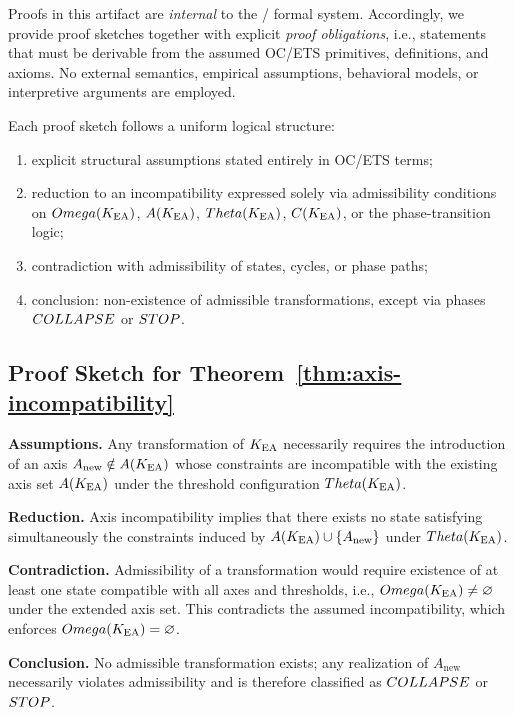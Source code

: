 ﻿%

Proofs in this artifact are \emph{internal} to the
\OC/ formal system. Accordingly, we provide proof
sketches together with explicit \emph{proof obligations}, i.e., statements
that must be derivable from the assumed OC/ETS primitives, definitions,
and axioms. No external semantics, empirical assumptions, behavioral
models, or interpretive arguments are employed.

Each proof sketch follows a uniform logical structure:
\begin{enumerate}
  \item explicit structural assumptions stated entirely in OC/ETS terms;
  \item reduction to an incompatibility expressed solely via admissibility
  conditions on $Omega(K_{\mathrm{EA}})$, $A(K_{\mathrm{EA}})$, $Theta(K_{\mathrm{EA}})$, $C(K_{\mathrm{EA}})$, or the
  phase-transition logic;
  \item contradiction with admissibility of states, cycles, or phase paths;
  \item conclusion: non-existence of admissible transformations, except via
  phases $COLLAPSE$ or $STOP$.
\end{enumerate}

\subsection*{Proof Sketch for Theorem~\ref{thm:axis-incompatibility}}

\textbf{Assumptions.}
Any transformation of $K_{\mathrm{EA}}$ necessarily requires the introduction of an
axis $A_{\mathrm{new}} \notin A(K_{\mathrm{EA}})$ whose constraints are incompatible
with the existing axis set $A(K_{\mathrm{EA}})$ under the threshold configuration
$Theta(K_{\mathrm{EA}})$.

\textbf{Reduction.}
Axis incompatibility implies that there exists no state satisfying
simultaneously the constraints induced by
$A(K_{\mathrm{EA}})\cup\{A_{\mathrm{new}}\}$ under $Theta(K_{\mathrm{EA}})$.

\textbf{Contradiction.}
Admissibility of a transformation would require existence of at least one
state compatible with all axes and thresholds, i.e.,
$Omega(K_{\mathrm{EA}})\neq\varnothing$ under the extended axis set. This contradicts
the assumed incompatibility, which enforces
$Omega(K_{\mathrm{EA}})=\varnothing$.

\textbf{Conclusion.}
No admissible transformation exists; any realization of
$A_{\mathrm{new}}$ necessarily violates admissibility and is therefore
classified as $COLLAPSE$ or $STOP$.

